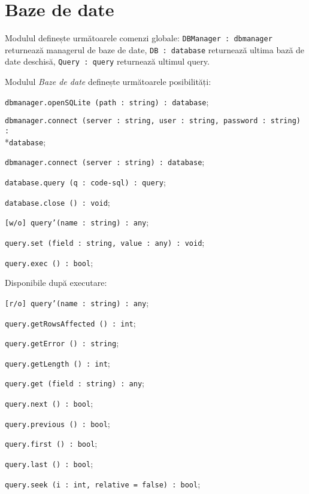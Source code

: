 \section{Baze de date}

Modulul definește următoarele comenzi globale: \texttt{DBManager : dbmanager} returnează managerul de baze de date, \texttt{DB : database} returnează ultima bază de date deschisă, \texttt{Query : query} returnează ultimul query.

Modulul \textit{Baze de date} definește următoarele posibilități:
\begin{icItems}
	\item \texttt{dbmanager.openSQLite (path : string) : database};
	\item \texttt{dbmanager.connect (server : string, user : string, password : string) :}\\*\texttt{database};
	\item \texttt{dbmanager.connect (server : string) : database};
	\item \texttt{database.query (q : code-sql) : query};
	\item \texttt{database.close () : void};
	\item \texttt{[w/o] query'(name : string) : any};
	\item \texttt{query.set (field : string, value : any) : void};
	\item \texttt{query.exec () : bool};
	\item Disponibile după executare:
	\begin{icItems}
		\item \texttt{[r/o] query'(name : string) : any};
		\item \texttt{query.getRowsAffected () : int};
		\item \texttt{query.getError () : string};
		\item \texttt{query.getLength () : int};
		\item \texttt{query.get (field : string) : any};
		\item \texttt{query.next () : bool};
		\item \texttt{query.previous () : bool};
		\item \texttt{query.first () : bool};
		\item \texttt{query.last () : bool};
		\item \texttt{query.seek (i : int, relative = false) : bool};
	\end{icItems}
\end{icItems}

